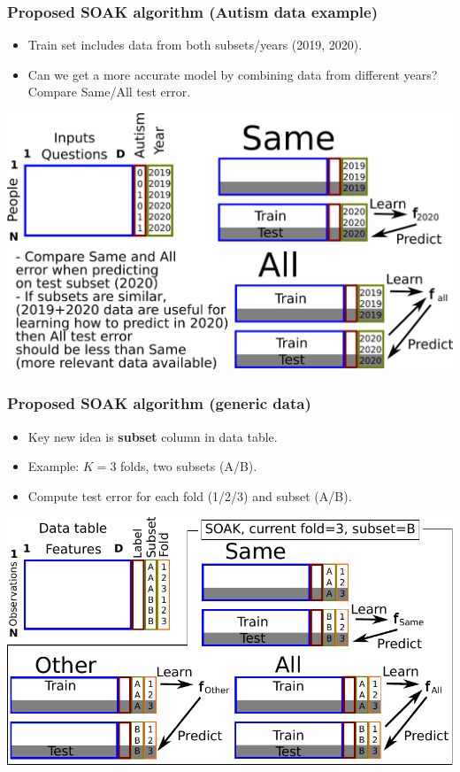 \documentclass[t]{beamer}
\begin{document}
\begin{frame}
  \frametitle{Proposed SOAK algorithm (Autism data example)}
  \begin{itemize}
  \item Train set includes data from both subsets/years (2019, 2020).
    \item Can we get a more accurate model by combining data from
      different years? Compare Same/All test error.
  \end{itemize}
  \includegraphics[width=\textwidth]{drawing-cv-same-all-years-ann}
\end{frame}

\begin{frame}
  \frametitle{Proposed SOAK algorithm (generic data)}
  \begin{itemize}
  \item Key new idea is \textbf{subset} column in data table.
  \item Example: $K=3$ folds, two subsets (A/B).
  \item Compute test error for each fold (1/2/3) and subset (A/B).
  \end{itemize}
  \includegraphics[width=\textwidth]{drawing-cv-same-other-generic}
\end{frame}
\end{document}

